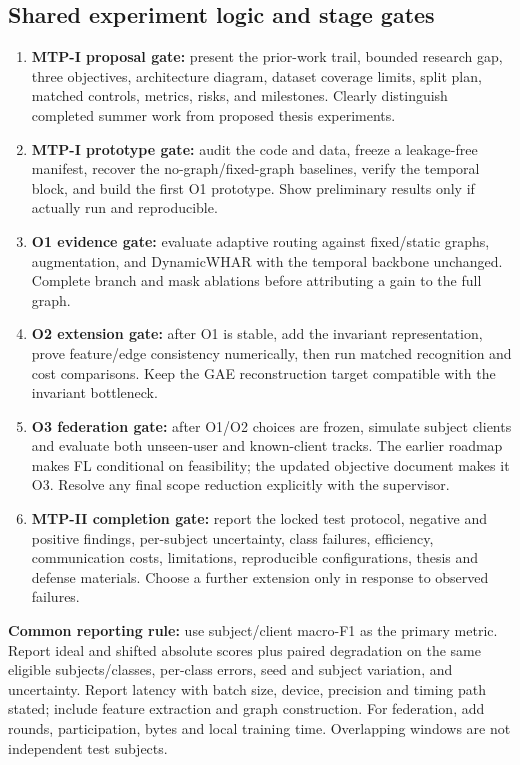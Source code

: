 \documentclass[10pt,a4paper]{article}
\begin{document}
\subsection{Shared experiment logic and stage gates}
\begin{enumerate}
\item \textbf{MTP-I proposal gate:} present the prior-work trail, bounded research gap, three objectives, architecture diagram, dataset coverage limits, split plan, matched controls, metrics, risks, and milestones. Clearly distinguish completed summer work from proposed thesis experiments.
\item \textbf{MTP-I prototype gate:} audit the code and data, freeze a leakage-free manifest, recover the no-graph/fixed-graph baselines, verify the temporal block, and build the first O1 prototype. Show preliminary results only if actually run and reproducible.
\item \textbf{O1 evidence gate:} evaluate adaptive routing against fixed/static graphs, augmentation, and DynamicWHAR with the temporal backbone unchanged. Complete branch and mask ablations before attributing a gain to the full graph.
\item \textbf{O2 extension gate:} after O1 is stable, add the invariant representation, prove feature/edge consistency numerically, then run matched recognition and cost comparisons. Keep the GAE reconstruction target compatible with the invariant bottleneck.
\item \textbf{O3 federation gate:} after O1/O2 choices are frozen, simulate subject clients and evaluate both unseen-user and known-client tracks. The earlier roadmap makes FL conditional on feasibility; the updated objective document makes it O3. Resolve any final scope reduction explicitly with the supervisor.
\item \textbf{MTP-II completion gate:} report the locked test protocol, negative and positive findings, per-subject uncertainty, class failures, efficiency, communication costs, limitations, reproducible configurations, thesis and defense materials. Choose a further extension only in response to observed failures.
\end{enumerate}

\textbf{Common reporting rule:} use subject/client macro-F1 as the primary metric. Report ideal and shifted absolute scores plus paired degradation on the same eligible subjects/classes, per-class errors, seed and subject variation, and uncertainty. Report latency with batch size, device, precision and timing path stated; include feature extraction and graph construction. For federation, add rounds, participation, bytes and local training time. Overlapping windows are not independent test subjects.
\end{document}
